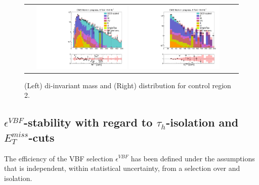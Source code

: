 \begin{figure}[tbh!]
	\centering
	\begin{tabular}{cc}
		\includegraphics[width=0.45\textwidth]{PLOTS/diTauHadLSQCDPlots/AllMCdiced/OS_CR2/OS_Central_invertedVBF_2TightIso_CR2/h_ditauinvariantmass_log.pdf}
		\includegraphics[width=0.45\textwidth]{PLOTS/diTauHadLSQCDPlots/AllMCdiced/OS_CR2/OS_Central_invertedVBF_2TightIso_CR2/h_met_log.pdf} 		
	\end{tabular}
	\caption{(Left) di-\hadtau invariant mass and (Right) \met distribution for control region 2.}
	\label{fig::CR2_controlplots}
\end{figure}

\subsection{$\epsilon^{VBF}$-stability with regard to $\tau_{h}$-isolation and $E_{T}^{miss}$-cuts}
\label{dihad:subsec:stability}

The efficiency of the VBF selection $\epsilon^{VBF}$ has been defined under the assumptions that is independent, within statistical uncertainty, from a selection over \met and \hadtau isolation.




